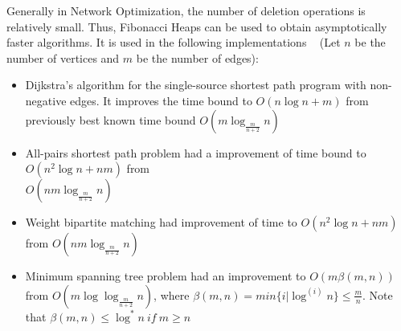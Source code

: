 Generally in Network Optimization, the number of deletion operations is relatively small. Thus, Fibonacci Heaps can be used to obtain asymptotically faster algorithms. It is used in the following implementations ~\cite{fredman1987fibonacci} (Let $n$ be the number of vertices and $m$ be the number of edges):
\begin{itemize}
	\item Dijkstra's algorithm for the single-source shortest path program with non-negative edges. It improves the time bound to $O(n \log{n} + m)$  from previously best known time bound $O(m\log_{\frac{m}{n+2}}n)$
	\item All-pairs shortest path problem had a improvement of time bound to $O(n^2\log{n} + nm)$ from \\ $O(nm\log_{\frac{m}{n+2}}n)$
	\item Weight bipartite matching had improvement of time to $O(n^2\log{n} + nm)$ from $O(nm\log_{\frac{m}{n+2}}n)$
	\item Minimum spanning tree problem had an improvement to $O(m\beta(m,n))$ from $O(m\log{\log_{\frac{m}{n+2}}n})$, where $\beta(m,n) = min\{i|\log^{(i)}n\} \leq \frac{m}{n}$. Note that $\beta(m,n) \leq \log^{*}n \ if \ m \geq n $
\end{itemize}